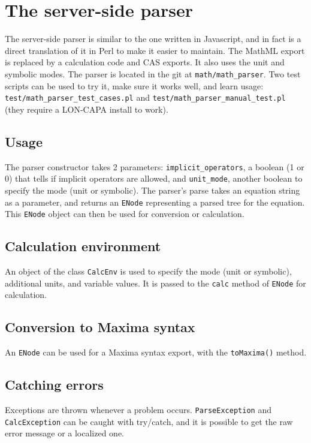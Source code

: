 \section{The server-side parser}

The server-side parser is similar to the one written in Javascript, and in fact is a direct translation of it
in Perl to make it easier to maintain.
The MathML export is replaced by a calculation code and CAS exports. It also uses the unit and
symbolic modes.
The parser is located in the git at \texttt{math/math\_parser}.
Two test scripts can be used to try it, make sure it works well, and learn usage:
\texttt{test/math\_parser\_test\_cases.pl} and \texttt{test/math\_parser\_manual\_test.pl}
(they require a LON-CAPA install to work).

\subsection{Usage}
The parser constructor takes 2 parameters: \texttt{implicit\_operators}, a boolean (1 or 0) that
tells if implicit operators are allowed, and
\texttt{unit\_mode}, another boolean to specify the mode (unit or symbolic).
The parser's parse takes an equation string as a parameter, and returns an \texttt{ENode} representing
a parsed tree for the equation. This \texttt{ENode} object can then be used for conversion or calculation.

\subsection{Calculation environment}
An object of the class \texttt{CalcEnv} is used to specify the mode (unit or symbolic), additional units,
and variable values. It is passed to the \texttt{calc} method of \texttt{ENode} for calculation.

\subsection{Conversion to Maxima syntax}
An \texttt{ENode} can be used for a Maxima syntax export, with the \texttt{toMaxima()} method.

\subsection{Catching errors}
Exceptions are thrown whenever a problem occurs.
\texttt{ParseException} and \texttt{CalcException} can be caught with try/catch,
and it is possible to get the raw error message or a localized one.

